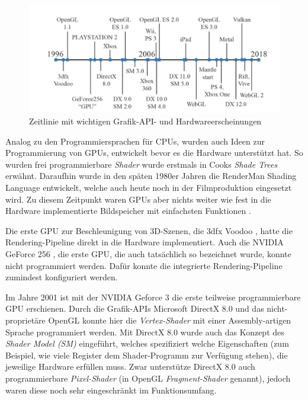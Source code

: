 \documentclass[oneside]{ausarbeitung}
\begin{document}
\begin{figure}
    \includegraphics[width=\textwidth]{images/api_timeline.png}
    \caption{Zeitlinie mit wichtigen Grafik-API- und Hardwareerscheinungen \cite[S. 38]{real_time_rendering}}
    \label{fig:barycentric_color}
\end{figure}

Analog zu den Programmiersprachen für \ac{CPU}s, wurden auch Ideen zur Programmierung von \ac{GPU}s, entwickelt bevor es die Hardware unterstützt hat. So wurden frei programmierbare \textit{Shader} wurde erstmals in Cooks \textit{Shade Trees} \cite{cook:shade_trees} erwähnt. Daraufhin wurde in den späten 1980er Jahren die RenderMan Shading Language \cite{pixar:rsl} entwickelt, welche auch heute noch in der Filmproduktion eingesetzt wird. Zu diesem Zeitpunkt waren \ac{GPU}s aber nichts weiter wie fest in die Hardware implementierte Bildspeicher mit einfachsten Funktionen \cite[Vgl.][]{gpu_history}.

Die erste \ac{GPU} zur Beschleunigung von 3D-Szenen, die 3dfx Voodoo \cite{wikipedia:3dfx_voodoo}, hatte die Rendering-Pipeline direkt in die Hardware implementiert. Auch die NVIDIA GeForce 256 \cite{wikipedia:geforce256}, die erste \ac{GPU}, die auch tatsächlich so bezeichnet wurde, konnte nicht programmiert werden. Dafür konnte die integrierte Rendering-Pipeline zumindest konfiguriert werden.

Im Jahre 2001 ist mit der NVIDIA Geforce 3 \cite{wikipedia:geforce3} die erste teilweise programmierbare \ac{GPU} erschienen. Durch die Grafik-APIs Microsoft DirectX 8.0 und das nicht-proprietäre OpenGL konnte hier die \textit{Vertex-Shader} mit einer Assembly-artigen Sprache programmiert werden. Mit DirectX 8.0 wurde auch das Konzept des \textit{Shader Model (SM)} \cite[Vgl.][Shader model comparison]{wikipedia:hlsl} eingeführt, welches spezifiziert welche Eigenschaften (zum Beispiel, wie viele Register dem Shader-Programm zur Verfügung stehen), die jeweilige Hardware erfüllen muss. Zwar unterstütze DirectX 8.0 auch programmierbare \textit{Pixel-Shader} (in OpenGL \textit{Fragment-Shader} genannt), jedoch waren diese noch sehr eingeschränkt im Funktionsumfang.
\end{document}
